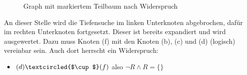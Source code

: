 \begin{figure}[htbp]
    \centering
    \caption{Graph mit markiertem Teilbaum nach Widerspruch}
\end{figure}

An dieser Stelle wird die Tiefensuche im linken Unterknoten abgebrochen, dafür im rechten Unterknoten fortgesetzt. Dieser ist bereits expandiert und wird ausgewertet. Dazu muss Knoten (f) mit den Knoten (b), (c) und (d) (logisch) vereinbar sein. Auch dort herrscht ein Widerspruch:
\begin{itemize}
    \item $(d) \textcircled{$\cup$} (f)$ also $\neg R \wedge R = \{\}$
\end{itemize}


